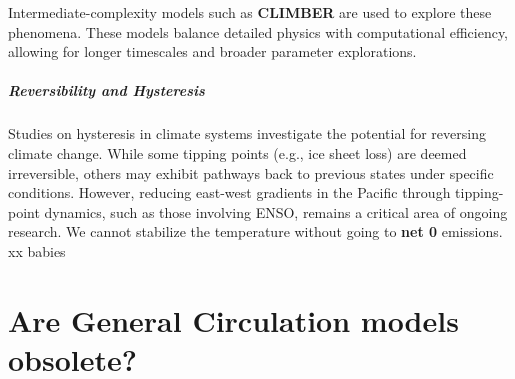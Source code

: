 Intermediate-complexity models such as \textbf{CLIMBER} are used to explore these phenomena. These models balance detailed physics with computational efficiency, allowing for longer timescales and broader parameter explorations.

\paragraph{Reversibility and Hysteresis}

Studies on hysteresis in climate systems investigate the potential for reversing climate change. While some tipping points (e.g., ice sheet loss) are deemed irreversible, others may exhibit pathways back to previous states under specific conditions. However, reducing east-west gradients in the Pacific through tipping-point dynamics, such as those involving ENSO, remains a critical area of ongoing research.
We cannot stabilize the temperature without going to \textbf{net 0} emissions.\\



xx babies

\chapter{Are General Circulation models obsolete?}